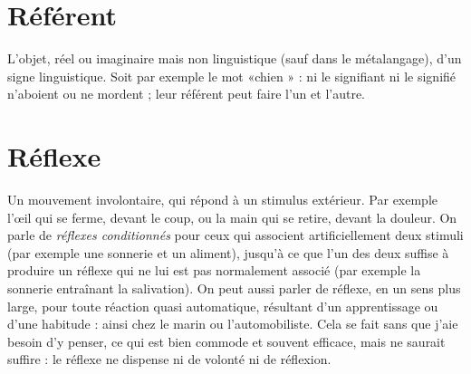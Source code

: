 \section{Référent}
L'objet, réel ou imaginaire mais non linguistique (sauf dans le
métalangage), d’un signe linguistique. Soit par exemple le mot
«chien » : ni le signifiant ni le signifié n’aboient ou ne mordent ; leur référent
peut faire l’un et l’autre.

\section{Réflexe}
Un mouvement involontaire, qui répond à un stimulus extérieur.
Par exemple l’œil qui se ferme, devant le coup, ou la main qui se
retire, devant la douleur. On parle de {\it réflexes conditionnés} pour ceux qui associent
artificiellement deux stimuli (par exemple une sonnerie et un aliment),
jusqu’à ce que l’un des deux suffise à produire un réflexe qui ne lui est pas normalement
associé (par exemple la sonnerie entraînant la salivation). On peut
aussi parler de réflexe, en un sens plus large, pour toute réaction quasi automatique,
résultant d’un apprentissage ou d’une habitude : ainsi chez le marin ou
l’automobiliste. Cela se fait sans que j'aie besoin d’y penser, ce qui est bien
commode et souvent efficace, mais ne saurait suffire : le réflexe ne dispense ni
de volonté ni de réflexion.

